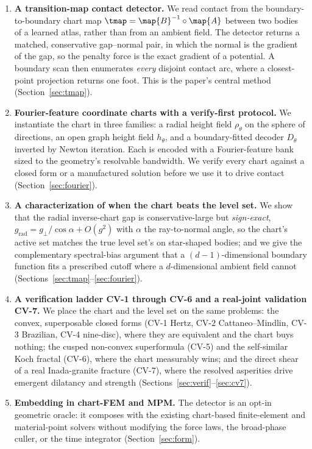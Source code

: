 \begin{enumerate}
  \item \textbf{A transition-map contact detector.} We read contact from the boundary-to-boundary chart
        map $\tmap=\map{B}^{-1}\circ\map{A}$ between two bodies of a learned atlas, rather than from an
        ambient field. The detector returns a matched, conservative gap--normal pair, in which the normal
        is the gradient of the gap, so the penalty force is the exact gradient of a potential. A
        boundary scan then enumerates \emph{every} disjoint contact arc, where a closest-point projection
        returns one foot. This is the paper's central method (Section~\ref{sec:tmap}).
  \item \textbf{Fourier-feature coordinate charts with a verify-first protocol.} We instantiate the chart
        in three families: a radial height field $\rho_\theta$ on the sphere of directions, an open
        graph height field $h_\theta$, and a boundary-fitted decoder $D_\theta$ inverted by Newton
        iteration. Each is encoded with a Fourier-feature bank sized to the geometry's resolvable
        bandwidth. We verify every chart against a closed form or a manufactured solution before we use
        it to drive contact (Section~\ref{sec:fourier}).
  \item \textbf{A characterization of when the chart beats the level set.} We show that the radial
        inverse-chart gap is conservative-large but \emph{sign-exact},
        $g_{\mathrm{rad}}=g_\perp/\cos\alpha+O(g^2)$ with $\alpha$ the ray-to-normal angle, so the
        chart's active set matches the true level set's on star-shaped bodies; and we give the
        complementary spectral-bias argument that a $(d{-}1)$-dimensional boundary function fits a
        prescribed cutoff where a $d$-dimensional ambient field cannot
        (Sections~\ref{sec:tmap}--\ref{sec:fourier}).
  \item \textbf{A verification ladder CV-1 through CV-6 and a real-joint validation CV-7.} We place the
        chart and the level set on the same problems: the convex, superposable closed forms
        (CV-1 Hertz, CV-2 Cattaneo--Mindlin, CV-3 Brazilian, CV-4 nine-disc), where they are equivalent
        and the chart buys nothing; the cusped non-convex superformula (CV-5) and the
        self-similar Koch fractal (CV-6), where the chart measurably wins; and the direct shear of a real
        Inada-granite fracture (CV-7), where the resolved asperities drive emergent dilatancy and strength
        (Sections~\ref{sec:verif}--\ref{sec:cv7}).
  \item \textbf{Embedding in chart-FEM and MPM.} The detector is an opt-in geometric oracle: it composes
        with the existing chart-based finite-element and material-point solvers without modifying the
        force laws, the broad-phase culler, or the time integrator (Section~\ref{sec:form}).
\end{enumerate}

